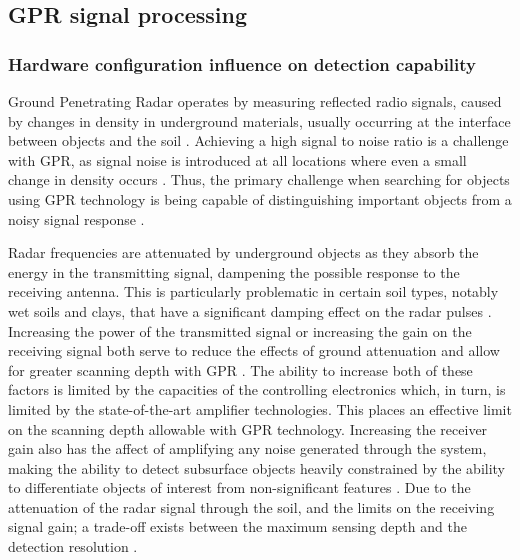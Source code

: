 \documentclass[main.tex]{subfiles}
\begin{document}
\subsection{GPR signal processing}
\subsubsection{Hardware configuration influence on detection capability}
Ground Penetrating Radar operates by measuring reflected radio signals, caused by changes in density in underground materials, usually occurring at the interface between objects and the soil \parencite{sakaguchi2014}. Achieving a high signal to noise ratio is a challenge with GPR, as signal noise is introduced at all locations where even a small change in density occurs \parencite{shresta2003}. Thus, the primary challenge when searching for objects using GPR technology is being capable of distinguishing important objects from a noisy signal response \parencite{sakaguchi2014}.

Radar frequencies are attenuated by underground objects as they absorb the energy in the transmitting signal, dampening the possible response to the receiving antenna. This is particularly problematic in certain soil types, notably wet soils and clays, that have a significant damping effect on the radar pulses \parencite{sakaguchi2014}. Increasing the power of the transmitted signal or increasing the gain on the receiving signal both serve to reduce the effects of ground attenuation and allow for greater scanning depth with GPR \parencite{Ho2008}. The ability to increase both of these factors is limited by the capacities of the controlling electronics which, in turn, is limited by the state-of-the-art amplifier technologies. This places an effective limit on the scanning depth allowable with GPR technology. Increasing the receiver gain also has the affect of amplifying any noise generated through the system, making the ability to detect subsurface objects heavily constrained by the ability to differentiate objects of interest from non-significant features \parencite{shresta2003}. Due to the attenuation of the radar signal through the soil, and the limits on the receiving signal gain; a trade-off exists between the maximum sensing depth and the detection resolution \parencite{Ho2008}.
\end{document}
